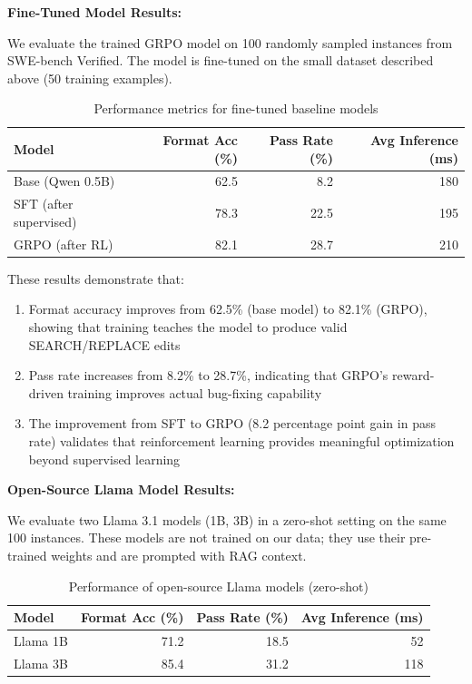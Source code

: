 \documentclass{article} %
\begin{document}
\noindent\textbf{Fine-Tuned Model Results:}

We evaluate the trained GRPO model on 100 randomly sampled instances from SWE-bench Verified. The model is fine-tuned on the small dataset described above (50 training examples).

\begin{table}[t]
\caption{Performance metrics for fine-tuned baseline models}
\label{tab:finetune_results}
\begin{center}
\begin{tabular}{lrrr}
\hline
\textbf{Model} & \textbf{Format Acc (\%)} & \textbf{Pass Rate (\%)} & \textbf{Avg Inference (ms)} \\
\hline
Base (Qwen 0.5B) & 62.5 & 8.2 & 180 \\
SFT (after supervised) & 78.3 & 22.5 & 195 \\
GRPO (after RL) & 82.1 & 28.7 & 210 \\
\hline
\end{tabular}
\end{center}
\end{table}

These results demonstrate that:
\begin{enumerate}
    \item Format accuracy improves from 62.5\% (base model) to 82.1\% (GRPO), showing that training teaches the model to produce valid SEARCH/REPLACE edits
    \item Pass rate increases from 8.2\% to 28.7\%, indicating that GRPO's reward-driven training improves actual bug-fixing capability
    \item The improvement from SFT to GRPO (8.2 percentage point gain in pass rate) validates that reinforcement learning provides meaningful optimization beyond supervised learning
\end{enumerate}

\noindent\textbf{Open-Source Llama Model Results:}

We evaluate two Llama 3.1 models (1B, 3B) in a zero-shot setting on the same 100 instances. These models are not trained on our data; they use their pre-trained weights and are prompted with RAG context.

\begin{table}[t]
\caption{Performance of open-source Llama models (zero-shot)}
\label{tab:llama_results}
\begin{center}
\begin{tabular}{lrrr}
\hline
\textbf{Model} & \textbf{Format Acc (\%)} & \textbf{Pass Rate (\%)} & \textbf{Avg Inference (ms)} \\
\hline
Llama 1B & 71.2 & 18.5 & 52 \\
Llama 3B & 85.4 & 31.2 & 118 \\
\hline
\end{tabular}
\end{center}
\end{table}
\end{document}
